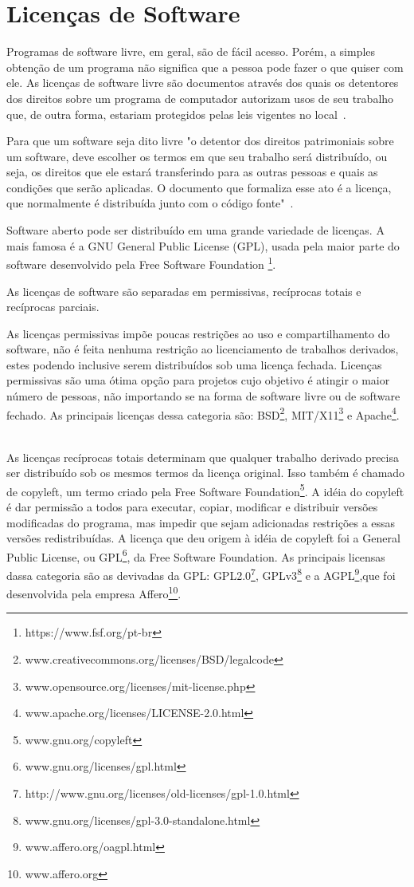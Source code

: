 \section{Licenças de Software}

Programas de software livre, em geral, são de fácil acesso. Porém, a simples obtenção
de um programa não significa que a pessoa pode fazer o que quiser com ele. As licenças
de software livre são documentos através dos quais os detentores dos direitos sobre um
programa de computador autorizam usos de seu trabalho que, de outra forma, estariam
protegidos pelas leis vigentes no local~\cite{sabino2009licenccas}.

Para que um software seja dito livre "o detentor dos direitos patrimoniais 
sobre um software, deve escolher os termos em que seu trabalho será distribuído, 
ou seja, os direitos que ele estará transferindo para as outras pessoas e quais as 
condições que serão aplicadas. O documento que formaliza esse ato é a licença, 
que normalmente é distribuída junto com o código fonte"~\cite{sabino2009licenccas}.

Software aberto pode ser distribuído em uma grande variedade de licenças.
A mais famosa é a GNU General Public License (GPL), usada pela maior
parte do software desenvolvido pela Free Software Foundation \footnote{https://www.fsf.org/pt-br}.

As licenças de software são separadas em permissivas, recíprocas totais e recíprocas
parciais.

As licenças permissivas impõe poucas restrições ao uso e compartilhamento do
software, não é feita nenhuma restrição ao licenciamento de trabalhos derivados, 
estes podendo inclusive serem distribuídos sob uma licença fechada. Licenças permissivas são 
uma ótima opção para projetos cujo objetivo é atingir o maior número de pessoas, 
não importando se na forma de software livre ou de software fechado. As principais 
licenças dessa categoria são: BSD\footnote{www.creativecommons.org/licenses/BSD/legalcode},
MIT/X11\footnote{www.opensource.org/licenses/mit-license.php} e Apache\footnote{www.apache.org/licenses/LICENSE-2.0.html}.
~\cite{sabino2009licenccas}

As licenças recíprocas totais determinam que qualquer trabalho derivado precisa 
ser distribuído sob os mesmos termos da licença original. Isso também é chamado de copyleft,
um termo criado pela Free Software Foundation\footnote{www.gnu.org/copyleft}. A idéia do
copyleft é dar permissão a todos para executar, copiar, modificar e distribuir versões
modificadas do programa, mas impedir que sejam adicionadas restrições a essas versões
redistribuídas. A licença que deu origem à idéia de copyleft foi a General Public 
License, ou GPL\footnote{www.gnu.org/licenses/gpl.html}, da Free Software Foundation.
As principais licensas dassa categoria são as devivadas da GPL: 
GPL2.0\footnote{http://www.gnu.org/licenses/old-licenses/gpl-1.0.html}, 
GPLv3\footnote{www.gnu.org/licenses/gpl-3.0-standalone.html} e a
AGPL\footnote{www.affero.org/oagpl.html},que foi desenvolvida pela empresa 
Affero\footnote{www.affero.org}.~\cite{sabino2009licenccas}


